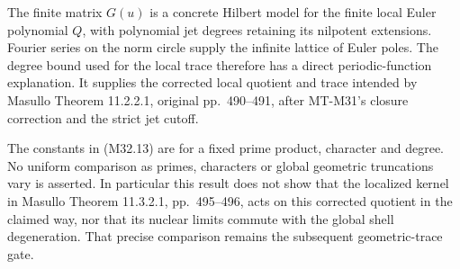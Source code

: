 The finite matrix $G(u)$ is a concrete Hilbert model for
the finite local Euler polynomial $Q$, with polynomial
jet degrees retaining its nilpotent extensions.  Fourier
series on the norm circle supply the infinite lattice of
Euler poles.  The degree bound used for the local trace
therefore has a direct periodic-function explanation.
It supplies the corrected local quotient and trace intended
by Masullo Theorem 11.2.2.1, original pp.~490--491,
after MT-M31's closure correction and the strict jet cutoff.

The constants in (M32.13) are for a fixed prime product,
character and degree.  No uniform comparison as primes,
characters or global geometric truncations vary is asserted.
In particular this result does not show that the
localized kernel in Masullo Theorem 11.3.2.1,
pp.~495--496, acts on this corrected quotient in the
claimed way, nor that its nuclear limits commute with
the global shell degeneration.  That precise comparison
remains the subsequent geometric-trace gate.
